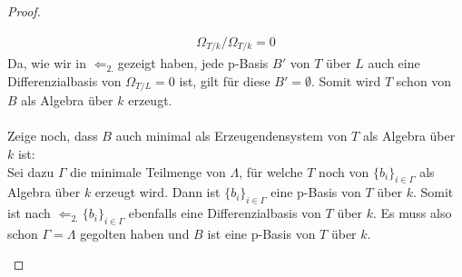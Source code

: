 \documentclass[10pt,a4paper]{report}
\newcommand{\comment}[1]{}
\newcommand{\divR}[2]{\Omega_{#1/#2}}
\begin{document}
\begin{proof}
\begin{itemize}
\begin{gather*}
\divR{T}{k}/\divR{T}{k} = 0
\end{gather*}
Da, wie wir in \glqq$\Leftarrow_{2.}$\grqq gezeigt haben, jede p-Basis $B'$ von $T$ über $L$ auch eine Differenzialbasis von $\divR{T}{L} = 0$ ist, gilt für diese $B' = \emptyset$. Somit wird $T$ schon von $B$ als Algebra über $k$ erzeugt.\\
\ \\
Zeige noch, dass $B$ auch minimal als Erzeugendensystem von $T$ als Algebra über $k$ ist:\\
Sei dazu $\Gamma$ die minimale Teilmenge von $\Lambda$, für welche $T$ noch von $\lbrace b_i \rbrace_{i \in \Gamma}$ als Algebra über $k$ erzeugt wird. Dann ist $\lbrace b_i \rbrace_{i \in \Gamma}$ eine p-Basis von $T$ über $k$. Somit ist nach \glqq$\Leftarrow_{2.}$\grqq $\lbrace b_i \rbrace_{i \in \Gamma}$ ebenfalls eine Differenzialbasis von $T$ über $k$. Es muss also schon $\Gamma = \Lambda$ gegolten haben und $B$ ist eine p-Basis von $T$ über $k$. \comment{\label{*p-Basis ist minnimaler Erzeuger von T als Algebra}}
\end{itemize}
\end{proof}
\end{document}
